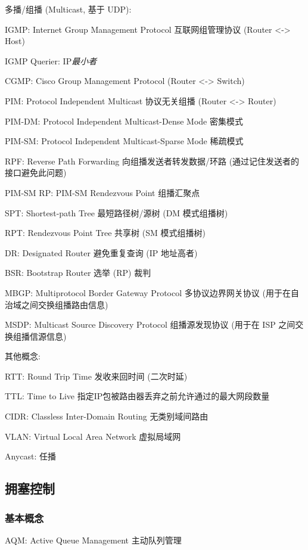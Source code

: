 \documentclass[UTF8,cs4size]{ctexart}
\begin{document}
多播/组播 (Multicast, 基于 UDP):
\begin{compactitem}
  \item IGMP: Internet Group Management Protocol 互联网组管理协议 (Router <-> Host)
  \item IGMP Querier: IP\textit{最小者}
  \item CGMP: Cisco Group Management Protocol (Router <-> Switch)
  \item PIM: Protocol Independent Multicast 协议无关组播 (Router <-> Router)
  \item PIM-DM: Protocol Independent Multicast-Dense Mode 密集模式
  \item PIM-SM: Protocol Independent Multicast-Sparse Mode 稀疏模式
  \item RPF: Reverse Path Forwarding 向组播发送者转发数据/环路 (通过记住发送者的接口避免此问题)
  \item PIM-SM RP: PIM-SM Rendezvous Point 组播汇聚点
  \item SPT: Shortest-path Tree 最短路径树/源树 (DM 模式组播树)
  \item RPT: Rendezvous Point Tree 共享树 (SM 模式组播树)
  \item DR: Designated Router 避免重复查询 (IP 地址高者)
  \item BSR: Bootstrap Router 选举 (RP) 裁判
  \item MBGP: Multiprotocol Border Gateway Protocol 多协议边界网关协议 (用于在自治域之间交换组播路由信息)
  \item MSDP: Multicast Source Discovery Protocol 组播源发现协议 (用于在 ISP 之间交换组播信源信息)
\end{compactitem}

其他概念:
\begin{compactitem}
  \item RTT: Round Trip Time 发收来回时间 (二次时延)
  \item TTL: Time to Live 指定IP包被路由器丢弃之前允许通过的最大网段数量
  \item CIDR: Classless Inter-Domain Routing 无类别域间路由
  \item VLAN: Virtual Local Area Network 虚拟局域网
  \item Anycast: 任播
\end{compactitem}

\subsection{拥塞控制}
\subsubsection{基本概念}
\begin{compactitem}
  \item AQM: Active Queue Management 主动队列管理
\end{compactitem}
\end{document}
